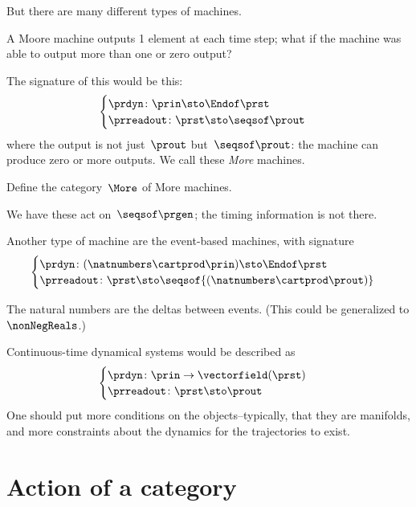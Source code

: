 But there are many different types of machines.

A Moore machine outputs 1 element at each time step; what if the machine was able to output more than one or zero output?

The signature of this would be this:
\begin{equation}\label{eq:more-signature}
  \begin{cases}
  \prdyn \colon \prin \sto \Endof \prst \\
  \prreadout \colon \prst \sto \seqsof \prout
  \end{cases}
\end{equation}
where the output is not just~$\prout$ but~$\seqsof \prout$: the machine can produce zero or more outputs. We call these \emph{More} machines.

\begin{exercise}
Define the category~$\More$ of More machines.
\end{exercise}

We have these act on~$\seqsof \prgen$; the timing information is not there.

Another type of machine are the event-based machines, with signature
\begin{equation} \label{eq:event-based}
  \begin{cases}
    \prdyn \colon (\natnumbers \cartprod \prin) \sto \Endof \prst \\
    \prreadout \colon \prst \sto \seqsof{ (\natnumbers \cartprod \prout)}
    \end{cases}
\end{equation}

The natural numbers are the deltas between events. (This could be generalized to $\nonNegReals$.)

Continuous-time dynamical systems would be described as
%
\begin{equation} \label{eq:continuous}
\begin{cases}
  \prdyn\colon \prin \to \vectorfield(\prst) \\
\prreadout\colon \prst \sto   \prout
\end{cases}
\end{equation}
%
One should put more conditions on the objects--typically, that they are manifolds, and more constraints about the dynamics for the trajectories to exist.


\section{Action of a category}

